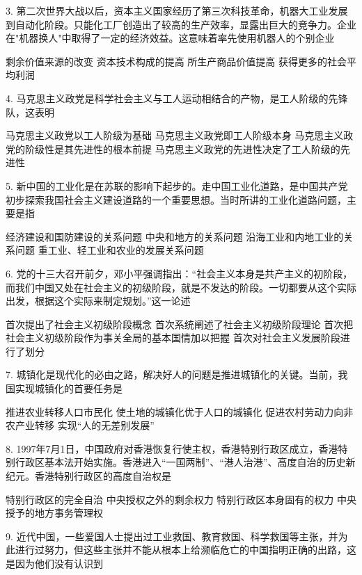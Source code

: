 3. 第二次世界大战以后，资本主义国家经历了第三次科技革命，机器大工业发展到自动化阶段。只能化工厂创造出了较高的生产效率，显露出巨大的竞争力。企业在"机器换人"中取得了一定的经济效益。这意味着率先使用机器人的个别企业
\begin{choices}
	 剩余价值来源的改变
	 资本技术构成的提高
	 所生产商品价值提高
	 获得更多的社会平均利润
\end{choices}
4. 马克思主义政党是科学社会主义与工人运动相结合的产物，是工人阶级的先锋队，这表明
\begin{choices}
	 马克思主义政党以工人阶级为基础
	 马克思主义政党即工人阶级本身
	 马克思主义政党的阶级性是其先进性的根本前提
	 马克思主义政党的先进性决定了工人阶级的先进性
\end{choices}
5. 新中国的工业化是在苏联的影响下起步的。走中国工业化道路，是中国共产党初步探索我国社会主义建设道路的一个重要思想。当时所讲的工业化道路问题，主要是指
\begin{choices}
	 经济建设和国防建设的关系问题
	 中央和地方的关系问题
	 沿海工业和内地工业的关系问题
	 重工业、轻工业和农业的发展关系问题
\end{choices}
6. 党的十三大召开前夕，邓小平强调指出：“社会主义本身是共产主义的初阶段，而我们中国又处在社会主义的初级阶段，就是不发达的阶段。一切都要从这个实际出发，根据这个实际来制定规划。”这一论述
\begin{choices}
	 首次提出了社会主义初级阶段概念
	 首次系统阐述了社会主义初级阶段理论
	 首次把社会主义初级阶段作为事关全局的基本国情加以把握
	 首次对社会主义发展阶段进行了划分
\end{choices}
7. 城镇化是现代化的必由之路，解决好人的问题是推进城镇化的关键。当前，我国实现城镇化的首要任务是
\begin{choices}
	 推进农业转移人口市民化
	 使土地的城镇化优于人口的城镇化
	 促进农村劳动力向非农产业转移
	 实现“人的无差别发展”
\end{choices}
8. 1997年7月1日，中国政府对香港恢复行使主权，香港特别行政区成立，香港特别行政区基本法开始实施。香港进入“一国两制”、“港人治港”、高度自治的历史新纪元。香港特别行政区的高度自治权是
\begin{choices}
	 特别行政区的完全自治
	 中央授权之外的剩余权力
	 特别行政区本身固有的权力
	 中央授予的地方事务管理权
\end{choices}
9. 近代中国，一些爱国人士提出过工业救国、教育救国、科学救国等主张，并为此进行过努力，但这些主张并不能从根本上给濒临危亡的中国指明正确的出路，这是因为他们没有认识到
